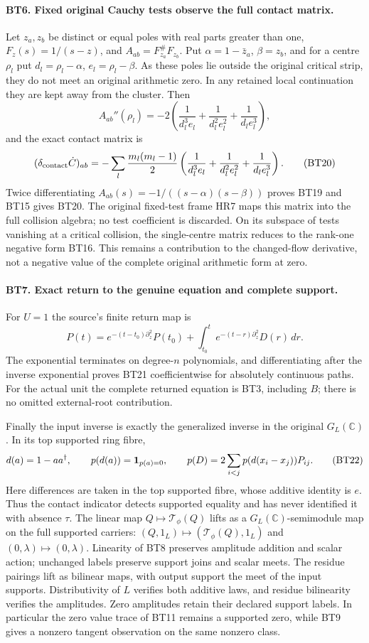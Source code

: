 \documentclass[11pt,a4paper]{article}
\theoremstyle{definition}\newtheorem{definition}[theorem]{Definition}
\begin{document}
\paragraph{BT6. Fixed original Cauchy tests observe the full contact matrix.}
Let $z_a,z_b$ be distinct or equal poles with real parts greater
than one, $F_z(s)=1/(s-z)$, and
$A_{ab}=F_{z_a}^\#F_{z_b}$. Put
$\alpha=1-\bar z_a$, $\beta=z_b$, and for a centre $\rho_l$
put $d_l=\rho_l-\alpha$, $e_l=\rho_l-\beta$.
As these poles lie outside the original critical strip, they do
not meet an original arithmetic zero. In any retained local
continuation they are kept away from the cluster. Then
\[
 A_{ab}''(\rho_l)=-2\left(
 \frac1{d_l^3e_l}+\frac1{d_l^2e_l^2}+\frac1{d_le_l^3}\right),
 \tag{BT19}
\]
and the exact contact matrix is
\[
 (\delta_{\rm contact}\dot C)_{ab}
 =-\sum_l\frac{m_l(m_l-1)}2
 \left(\frac1{d_l^3e_l}+\frac1{d_l^2e_l^2}+\frac1{d_le_l^3}\right).
 \tag{BT20}
\]
Twice differentiating $A_{ab}(s)=-1/((s-\alpha)(s-\beta))$
proves BT19 and BT15 gives BT20. The original fixed-test frame
HR7 maps this matrix into the full collision algebra; no test
coefficient is discarded. On its subspace of tests vanishing at
a critical collision, the single-centre matrix reduces to the
rank-one negative form BT16. This remains a contribution to
the changed-flow derivative, not a negative value of the complete
original arithmetic form at zero.

\paragraph{BT7. Exact return to the genuine equation and complete support.}
For $U=1$ the source's finite return map is
\[
 P(t)=e^{-(t-t_0)\partial_z^2}P(t_0)
       +\int_{t_0}^t e^{-(t-r)\partial_z^2}D(r)\,dr.
 \tag{BT21}
\]
The exponential terminates on degree-$n$ polynomials, and
differentiating after the inverse exponential proves BT21
coefficientwise for absolutely continuous paths. For the actual
unit the complete returned equation is BT3, including $B$;
there is no omitted external-root contribution.

Finally the input inverse is exactly the generalized inverse in
the original $G_L(\mathbb C)$. In its top supported ring fibre,
\[
 d(a)=1-aa^\dagger,
 \qquad p(d(a))={\bf1}_{p(a)=0},\qquad
 p(D)=2\sum_{i<j}p(d(x_i-x_j))P_{ij}.
 \tag{BT22}
\]
Here differences are taken in the top supported fibre, whose
additive identity is $e$. Thus the contact indicator detects
supported equality and has never identified it with absence
$\tau$. The linear map $Q\mapsto\mathcal T_\phi(Q)$ lifts as a
$G_L(\mathbb C)$-semimodule map on the full supported carriers:
$(Q,1_L)\mapsto(\mathcal T_\phi(Q),1_L)$ and
$(0,\lambda)\mapsto(0,\lambda)$. Linearity of BT8 preserves
amplitude addition and scalar action; unchanged labels preserve
support joins and scalar meets. The residue pairings lift as
bilinear maps, with output support the meet of the input supports.
Distributivity of $L$ verifies both additive laws, and residue
bilinearity verifies the amplitudes. Zero amplitudes retain their
declared support labels. In particular the
zero value trace of BT11 remains a supported zero, while BT9
gives a nonzero tangent observation on the same nonzero class.
\end{document}
